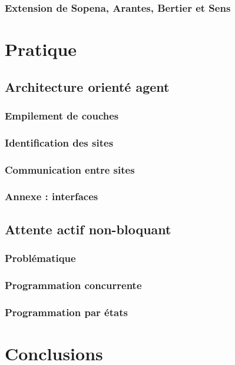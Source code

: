 \documentclass[a4paper,french,towsides,10pt]{book}
\begin{document}
\subsection{Extension de Sopena, Arantes, Bertier et Sens}


\chapter{Pratique}

\section{Architecture orienté agent}
\subsection{Empilement de couches}

\subsection{Identification des sites}

\subsection{Communication entre sites}

\subsection{Annexe : interfaces}


\section{Attente actif non-bloquant}
\subsection{Problématique}

\subsection{Programmation concurrente}

\subsection{Programmation par états}



\chapter*{Conclusions}

\end{document}
